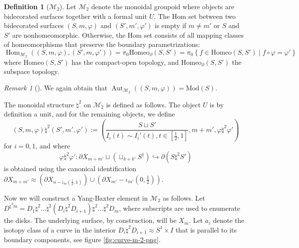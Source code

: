 \documentclass[reqno]{amsart}
\theoremstyle{definition}
\newtheorem{definition}[theorem]{Definition}
\theoremstyle{remark}
\newtheorem*{remark}{Remark}
\DeclareMathOperator{\Hom}{Hom}
\DeclareMathOperator{\Aut}{Aut}
\newcommand{\Mod}{{\mathrm{Mod}}}
\newcommand{\Homeo}{{\mathrm{Homeo}}}
\begin{document}
\begin{definition}[$\mathcal{M}_2$]
    Let $\mathcal{M}_2$ denote the monoidal groupoid
    where objects are bidecorated surfaces together
    with a formal unit $U$. The Hom set
    between two bidecorated surfaces
    $\left( S, m, \varphi  \right) $ and
    $\left( S', m', \varphi' \right) $ is
    empty if $m\neq m'$ or $S$ and $S'$ are nonhomeomorphic.
    Otherwise, the Hom set consists of all mapping
    classes of homeomorphisms that preserve the
    boundary parametrizations:
    \[
    \Hom_{\mathcal{M}_2}\left( 
    \left( S,m,\varphi  \right) , 
\left( S', m, \varphi' \right) \right) 
= 
    \pi_0 \Homeo_{\partial}\left( S,S' \right) 
    = \pi_0 \left\{ f \in \Homeo \left( S,S' \right) 
    \mid f \circ \varphi  = \varphi' \right\}
\] 
where $\Homeo\left( S,S' \right) $ has the compact-open
topology, and 
$\Homeo_{\partial}\left( S,S' \right) $ the subspace topology.
\end{definition}

\begin{remark}[]
    We again obtain that
    $\Aut_{\mathcal{M}_2}
    \left( \left( S,m,\varphi  \right)  \right) 
    = \Mod (S)$.
\end{remark}

The monoidal structure $\natural^2 $ on $\mathcal{M}_2$ is defined
as follows. The object $U$ is by definition a unit,
and for the remaining objects, we define
\[
    \left( S,m, \varphi  \right) \natural^2
    \left( S',m', \varphi ' \right) 
    :=
    \left( \frac{S \sqcup S'}{I_i(t)
    \sim \overline{I_i'}(t), t \in 
\left[ \frac{1}{2},1 \right] }, m+m',
\varphi \natural^2 \varphi ' \right) 
\] 
for $i = 0,1$, and where
\[
\varphi \natural^2 \varphi ' \colon
\partial X_{m+m'} \sqcup \left( \sqcup_{k+k'}
S^{1}\right) \hookrightarrow \partial
\left( S \natural^2 S' \right) 
\] 
is obtained using the canonical identification
$\partial X_{m+m'} \approx 
\left( \partial X_{n - \iota_m \left( \frac{1}{2},1
\right) } \right) \cup 
\left( \partial X_{m'} - 
\iota_{m'} \left( 0, \frac{1}{2} \right) \right)$.

Now we will construct a Yang-Baxter element
in $\mathcal{M}_2$ as follows. Let
$D^{\natural^2 m} = D_1 \natural^2 \ldots \natural^2
\left( D_i \natural^2 D_{i+1} \right) 
\natural^2 \ldots \natural^2 D_m$, where subscripts are used to enumerate
the disks. The underlying surface, by construction, will
be $X_m$. Let
$a_i$ denote the isotopy class of a curve in the interior
$D_i \natural^2 D_{i+1} \approx
S^{1} \times I$ that is parallel to its
boundary components, see figure \ref{fig:curve-m-2-png}.
\end{document}
